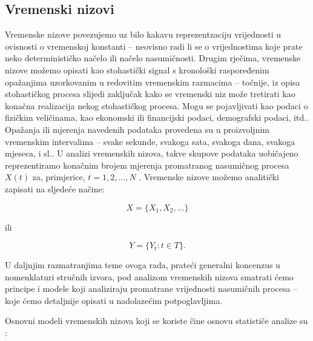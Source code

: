 \documentclass[a4paper,12pt,oneside]{memoir}
\begin{document}
    
        \subsection{Vremenski nizovi}

            Vremenske nizove povezujemo uz bilo kakavu reprezentzaciju vrijednosti u ovisnosti o vremenskoj konstanti -- neovisno radi li se o vrijednostima koje prate neko determinističko načelo ili načelo nasumičnosti. Drugim rječima, vremenske nizove možemo opisati kao stohastički signal s kronološki raspoređenim opažanjima uzorkovanim u redovitim vremenskim razmacima -- točnije, iz opisa stohastičkog procesa slijedi zaključak kako se vremenski niz može tretirati kao konačna realizacija nekog stohastičkog procesa. Mogu se pojavljivati kao podaci o fizičkim veličinama, kao ekonomski ili financijski podaci, demografski podaci, itd.. Opažanja ili mjerenja navedenih podataka provedena su u proizvoljnim vremenskim intervalima -- svake sekunde, svakoga sata, svakoga dana, svakoga mjeseca, i sl.. U analizi vremenskih nizova, takve skupove podataka uobičajeno reprezentiramo konačnim brojem mjerenja promatranog nasumičnog procesa $X(t)$ za, primjerice, $t=1,2,\ldots,N$ \cite{Priestley}. Vremenske nizove možemo analitički zapisati na sljedeće načine:

            \begin{equation}
                X=\{X_1,X_2,\ldots\}
            \end{equation}

            ili

            \begin{equation}
                Y=\{Y_t: t\in T\}.
            \end{equation}
            
            U daljnjim razmatranjima teme ovoga rada, prateći generalni koncenzus u nomenklaturi stručnih izvora, pod analizom vremenskih nizova smatrati ćemo principe i modele koji analiziraju promatrane vrijednosti nasumičnih procesa -- koje ćemo detaljnije opisati u nadolazećim potpoglavljima.

            Osnovni modeli vremenskih nizova koji se koriste čine osnovu statističe analize su \cite{Bahovec}:
\end{document}
